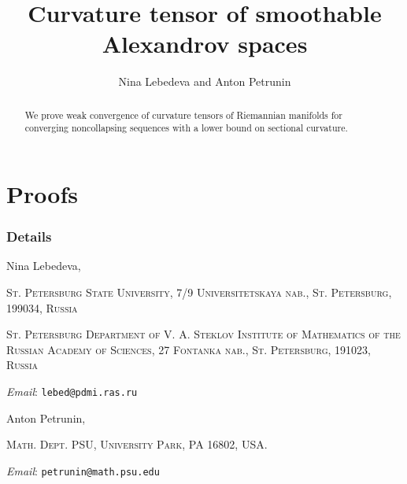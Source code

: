 \documentclass[a4paper]{article}
\begin{document}


\title{Curvature tensor of smoothable Alexandrov spaces}
\date{}
\author{Nina Lebedeva and Anton Petrunin} 
\maketitle

\begin{abstract}
We prove weak convergence of curvature tensors of Riemannian manifolds 
for converging noncollapsing sequences with a lower bound on sectional curvature.
\end{abstract}

\newcommand{\Addresses}{{\bigskip\footnotesize

\noindent Nina Lebedeva,
\par\nopagebreak
 \textsc{St. Petersburg State University, 7/9 Universitetskaya nab., St. Petersburg, 199034, Russia}
\par
\nopagebreak
 \textsc{St. Petersburg Department of V. A. Steklov Institute of Mathematics of the Russian Academy of Sciences, 27 Fontanka nab., St. Petersburg, 191023, Russia}
  \par\nopagebreak
  \textit{Email}: \texttt{lebed@pdmi.ras.ru}

\medskip

\noindent   Anton Petrunin, 
\par\nopagebreak
 \textsc{Math. Dept. PSU, University Park, PA 16802, USA.}
  \par\nopagebreak
  \textit{Email}: \texttt{petrunin@math.psu.edu}
  
}}




\tableofcontents




\part*{Proofs}











%

%
%
%

\section*{Details}






{\sloppy

\def\emph{\textit}
\printbibliography[heading=bibintoc]
\fussy
}

\Addresses
\end{document}
